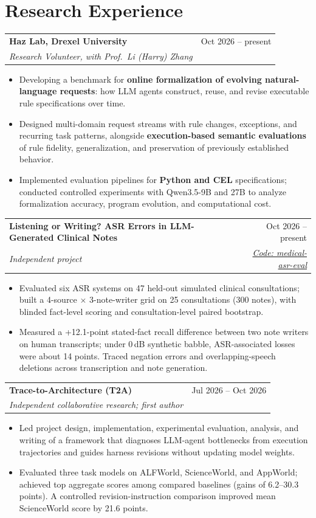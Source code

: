\documentclass[10pt]{article}
\makeatletter
\newcommand{\entry}[4]{%
  \begin{tabularx}{\linewidth}{@{}X r@{}}
    \textbf{#1} & #2 \\
    \textit{#3} & \textit{#4} \\
  \end{tabularx}\vspace{-0.2ex}}
\makeatother
\begin{document}
\section{Research Experience}
\entry{Haz Lab, Drexel University}{Oct 2026 -- present}{Research Volunteer, with Prof.\ Li (Harry) Zhang}{}
\begin{itemize}
  \item Developing a benchmark for \textbf{online formalization of evolving natural-language requests}: how LLM agents construct, reuse, and revise executable rule specifications over time.
  \item Designed multi-domain request streams with rule changes, exceptions, and recurring task patterns, alongside \textbf{execution-based semantic evaluations} of rule fidelity, generalization, and preservation of previously established behavior.
  \item Implemented evaluation pipelines for \textbf{Python and CEL} specifications; conducted controlled experiments with Qwen3.5-9B and 27B to analyze formalization accuracy, program evolution, and computational cost.
\end{itemize}
\vspace{0.4ex}
\entry{Listening or Writing? ASR Errors in LLM-Generated Clinical Notes}{Oct 2026 -- present}{Independent project}{\href{https://github.com/Fw93810/medical-asr-eval}{Code: medical-asr-eval}}
\begin{itemize}
  \item Evaluated six ASR systems on 47 held-out simulated clinical consultations; built a 4-source $\times$ 3-note-writer grid on 25 consultations (300 notes), with blinded fact-level scoring and consultation-level paired bootstrap.
  \item Measured a +12.1-point stated-fact recall difference between two note writers on human transcripts; under 0\,dB synthetic babble, ASR-associated losses were about 14 points. Traced negation errors and overlapping-speech deletions across transcription and note generation.
\end{itemize}
\vspace{0.4ex}
\entry{Trace-to-Architecture (T2A)}{Jul 2026 -- Oct 2026}{Independent collaborative research; first author}{}
\begin{itemize}
  \item Led project design, implementation, experimental evaluation, analysis, and writing of a framework that diagnoses LLM-agent bottlenecks from execution trajectories and guides harness revisions without updating model weights.
  \item Evaluated three task models on ALFWorld, ScienceWorld, and AppWorld; achieved top aggregate scores among compared baselines (gains of 6.2--30.3 points). A controlled revision-instruction comparison improved mean ScienceWorld score by 21.6 points.
\end{itemize}
\end{document}
